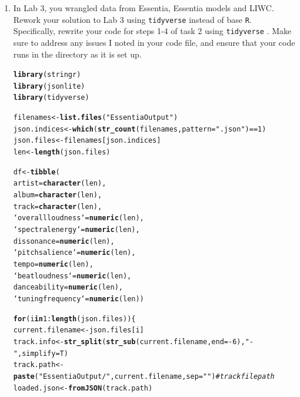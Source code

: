 \documentclass{article}\usepackage[]{graphicx}\usepackage[]{xcolor}
\makeatletter
\newcommand{\hlnum}[1]{\textcolor[rgb]{0.686,0.059,0.569}{#1}}%
\newcommand{\hlsng}[1]{\textcolor[rgb]{0.192,0.494,0.8}{#1}}%
\newcommand{\hlcom}[1]{\textcolor[rgb]{0.678,0.584,0.686}{\textit{#1}}}%
\newcommand{\hlopt}[1]{\textcolor[rgb]{0,0,0}{#1}}%
\newcommand{\hldef}[1]{\textcolor[rgb]{0.345,0.345,0.345}{#1}}%
\newcommand{\hlkwa}[1]{\textcolor[rgb]{0.161,0.373,0.58}{\textbf{#1}}}%
\newcommand{\hlkwb}[1]{\textcolor[rgb]{0.69,0.353,0.396}{#1}}%
\newcommand{\hlkwc}[1]{\textcolor[rgb]{0.333,0.667,0.333}{#1}}%
\newcommand{\hlkwd}[1]{\textcolor[rgb]{0.737,0.353,0.396}{\textbf{#1}}}%
\newenvironment{kframe}{%
 \def\at@end@of@kframe{}%
 \ifinner\ifhmode%
  \def\at@end@of@kframe{\end{minipage}}%
  \begin{minipage}{\columnwidth}%
 \fi\fi%
 \def\FrameCommand##1{\hskip\@totalleftmargin \hskip-\fboxsep
 \colorbox{shadecolor}{##1}\hskip-\fboxsep
     \hskip-\linewidth \hskip-\@totalleftmargin \hskip\columnwidth}%
 \MakeFramed {\advance\hsize-\width
   \@totalleftmargin\z@ \linewidth\hsize
   \@setminipage}}%
 {\par\unskip\endMakeFramed%
 \at@end@of@kframe}
\newenvironment{knitrout}{}{} %
\makeatother
\begin{document}
\begin{enumerate}
\item In Lab 3, you wrangled data from Essentia, Essentia models and LIWC. Rework your 
solution to Lab 3 using \texttt{tidyverse} \citep{tidyverse} instead of base \texttt{R}.
Specifically, rewrite your code for steps 1-4 of task 2 using \texttt{tidyverse} \citep{tidyverse}. 
Make sure to address any issues I noted in your code file, and ensure that your code 
runs in the directory as it is set up.
\begin{knitrout}\scriptsize
{}\color{fgcolor}\begin{kframe}
\begin{alltt}
\hlkwd{library}\hldef{(stringr)}
\hlkwd{library}\hldef{(jsonlite)}
\hlkwd{library}\hldef{(tidyverse)}

\hldef{filenames} \hlkwb{<-} \hlkwd{list.files}\hldef{(}\hlsng{"EssentiaOutput"}\hldef{)}
\hldef{json.indices} \hlkwb{<-} \hlkwd{which}\hldef{(}\hlkwd{str_count}\hldef{(filenames,} \hlkwc{pattern} \hldef{=} \hlsng{".json"}\hldef{)}\hlopt{==}\hlnum{1}\hldef{)}
\hldef{json.files} \hlkwb{<-} \hldef{filenames[json.indices]}
\hldef{len} \hlkwb{<-} \hlkwd{length}\hldef{(json.files)}

\hldef{df} \hlkwb{<-} \hlkwd{tibble}\hldef{(}
  \hlkwc{artist} \hldef{=} \hlkwd{character}\hldef{(len),}
  \hlkwc{album} \hldef{=} \hlkwd{character}\hldef{(len),}
  \hlkwc{track} \hldef{=} \hlkwd{character}\hldef{(len),}
  \hlkwc{`overall loudness`} \hldef{=} \hlkwd{numeric}\hldef{(len),}
  \hlkwc{`spectral energy`} \hldef{=} \hlkwd{numeric}\hldef{(len),}
  \hlkwc{dissonance} \hldef{=} \hlkwd{numeric}\hldef{(len),}
  \hlkwc{`pitch salience`} \hldef{=} \hlkwd{numeric}\hldef{(len),}
  \hlkwc{tempo} \hldef{=} \hlkwd{numeric}\hldef{(len),}
  \hlkwc{`beat loudness`} \hldef{=} \hlkwd{numeric}\hldef{(len),}
  \hlkwc{danceability} \hldef{=} \hlkwd{numeric}\hldef{(len),}
  \hlkwc{`tuning frequency`} \hldef{=} \hlkwd{numeric}\hldef{(len))}

\hlkwa{for}\hldef{(i} \hlkwa{in} \hlnum{1}\hlopt{:}\hlkwd{length}\hldef{(json.files))\{}
  \hldef{current.filename} \hlkwb{<-} \hldef{json.files[i]}
  \hldef{track.info} \hlkwb{<-} \hlkwd{str_split}\hldef{(}\hlkwd{str_sub}\hldef{(current.filename,} \hlkwc{end} \hldef{=} \hlopt{-}\hlnum{6}\hldef{),} \hlsng{"-"}\hldef{,} \hlkwc{simplify} \hldef{= T)}
  \hldef{track.path} \hlkwb{<-} \hlkwd{paste}\hldef{(}\hlsng{"EssentiaOutput/"}\hldef{,current.filename,} \hlkwc{sep} \hldef{=} \hlsng{""}\hldef{)} \hlcom{# track file path}
  \hldef{loaded.json} \hlkwb{<-} \hlkwd{fromJSON}\hldef{(track.path)}


\end{alltt}
\end{kframe}
\end{knitrout}
\end{enumerate}
\end{document}
